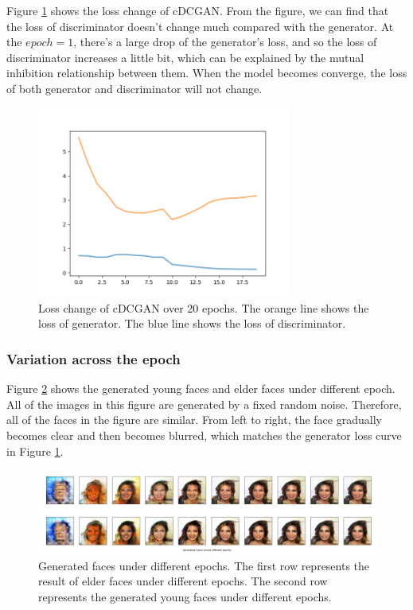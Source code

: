 \documentclass{article}
\begin{document}
Figure \ref{cdcgan_loss} shows the loss change of cDCGAN. From the figure, we can find that the loss of discriminator doesn't change much compared with the generator. At the $epoch=1$, there's a large drop of the generator's loss, and so the loss of discriminator increases a little bit, which can be explained by the mutual inhibition relationship between them. When the model becomes converge, the loss of both generator and discriminator will not change.
\begin{figure}[H]
\begin{center}
  \centering
  \includegraphics[width=3.3in]{image/cgan_loss.png}
\end{center}
\caption{Loss change of cDCGAN over 20 epochs. The orange line shows the loss of generator. The blue line shows the loss of discriminator.}
\label{cdcgan_loss}
\end{figure}


\subsubsection{Variation across the epoch}
Figure \ref{epoch_variation} shows the generated young faces and elder faces under different epoch. All of the images in this figure are generated by a fixed random noise. Therefore, all of the faces in the figure are similar. From left to right, the face gradually becomes clear and then becomes blurred, which matches the generator loss curve in Figure \ref{cdcgan_loss}.

\begin{figure}[H]
\begin{center}
  \centering
  \includegraphics[width=5in]{image/epoch_variation.png}
\end{center}
\caption{Generated faces under different epochs. The first row represents the result of elder faces under different epochs. The second row represents the generated young faces under different epochs.}
\label{epoch_variation}
\end{figure}
\end{document}
